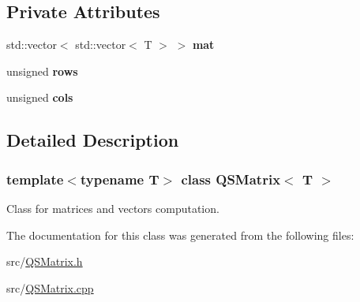 \subsection*{Private Attributes}
\begin{DoxyCompactItemize}
\item 
\mbox{\label{classQSMatrix_a3b00ff1ea79138d48928cd8e6844c37a}} 
std\+::vector$<$ std\+::vector$<$ T $>$ $>$ {\bfseries mat}
\item 
\mbox{\label{classQSMatrix_a4876bd443be51265e38f916b772ea3c8}} 
unsigned {\bfseries rows}
\item 
\mbox{\label{classQSMatrix_a8afb78dc369b889127a8ac8bbf3bf628}} 
unsigned {\bfseries cols}
\end{DoxyCompactItemize}


\subsection{Detailed Description}
\subsubsection*{template$<$typename T$>$\newline
class Q\+S\+Matrix$<$ T $>$}

Class for matrices and vectors computation. 

The documentation for this class was generated from the following files\+:\begin{DoxyCompactItemize}
\item 
src/\hyperlink{QSMatrix_8h}{Q\+S\+Matrix.\+h}\item 
src/\hyperlink{QSMatrix_8cpp}{Q\+S\+Matrix.\+cpp}\end{DoxyCompactItemize}
